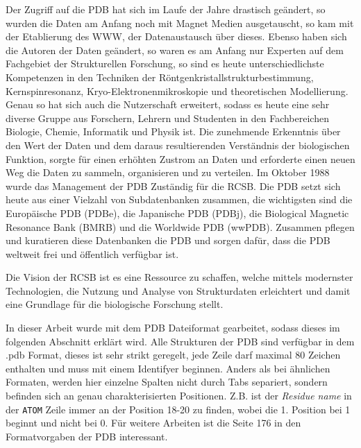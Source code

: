 
Der Zugriff auf die \ac{PDB} hat sich im Laufe der Jahre drastisch geändert, so wurden die Daten am Anfang noch mit Magnet Medien ausgetauscht, so kam mit der Etablierung des WWW, der Datenaustausch über dieses. Ebenso haben sich die Autoren der Daten geändert, so waren es am Anfang nur Experten auf dem Fachgebiet der Strukturellen Forschung, so sind es heute unterschiedlichste Kompetenzen in den Techniken der Röntgenkristallstrukturbestimmung, Kernspinresonanz, Kryo-Elektronenmikroskopie und theoretischen Modellierung. Genau so hat sich auch die Nutzerschaft erweitert, sodass es heute eine sehr diverse Gruppe aus Forschern, Lehrern und Studenten in den Fachbereichen Biologie, Chemie, Informatik und Physik ist. Die zunehmende Erkenntnis über den Wert der Daten und dem daraus resultierenden Verständnis der biologischen Funktion, sorgte für einen erhöhten Zustrom an Daten und erforderte einen neuen Weg die Daten zu sammeln, organisieren und zu verteilen. Im Oktober 1988 wurde das Management der \ac{PDB} Zuständig für die \ac{RCSB}. Die \ac{PDB} setzt sich heute aus einer Vielzahl von Subdatenbanken zusammen, die wichtigsten sind die Europäische \ac{PDB} (PDBe), die Japanische \ac{PDB} (PDBj), die Biological Magnetic Resonance Bank (BMRB) und die Worldwide \ac{PDB} (wwPDB). Zusammen pflegen und kuratieren diese Datenbanken die \ac{PDB} und sorgen dafür, dass die \ac{PDB} weltweit frei und öffentlich verfügbar ist.

Die Vision der RCSB ist es eine Ressource zu schaffen, welche mittels modernster Technologien, die Nutzung und Analyse von Strukturdaten erleichtert und damit eine Grundlage für die biologische Forschung stellt. 

In dieser Arbeit wurde mit dem \ac{PDB} Dateiformat gearbeitet, sodass dieses im folgenden Abschnitt erklärt wird. Alle Strukturen der \ac{PDB} sind verfügbar in dem .pdb Format, dieses ist sehr strikt geregelt, jede Zeile darf maximal 80 Zeichen enthalten und muss mit einem Identifyer beginnen. Anders als bei ähnlichen Formaten, werden hier einzelne Spalten nicht durch Tabs separiert, sondern befinden sich an genau charakterisierten Positionen. Z.B. ist der \emph{Residue name} in der \texttt{ATOM} Zeile immer an der Position 18-20 zu finden, wobei die 1. Position bei 1 beginnt und nicht bei 0. Für weitere Arbeiten ist die Seite 176 in den Formatvorgaben der \ac{PDB} interessant.


